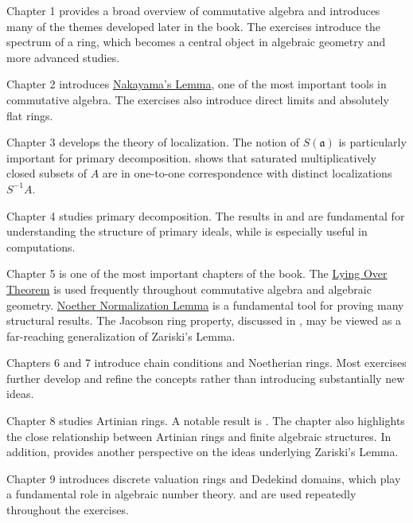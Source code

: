 Chapter 1 provides a broad overview of commutative algebra and introduces many of the themes developed later in the book. The exercises introduce the spectrum of a ring, which becomes a central object in algebraic geometry and more advanced studies.
\vspace{10pt}

Chapter 2 introduces \hyperref[2.6]{Nakayama's Lemma}, one of the most important tools in commutative algebra. The exercises also introduce direct limits and absolutely flat rings.
\vspace{10pt}

Chapter 3 develops the theory of localization. The notion of $S(\mathfrak{a})$ is particularly important for primary decomposition.  shows that saturated multiplicatively closed subsets of $A$ are in one-to-one correspondence with distinct localizations $S^{-1}A$.
\vspace{10pt}

Chapter 4 studies primary decomposition. The results in  and  are fundamental for understanding the structure of primary ideals, while  is especially useful in computations.
\vspace{10pt}

Chapter 5 is one of the most important chapters of the book. The \hyperref[5.10]{Lying Over Theorem} is used frequently throughout commutative algebra and algebraic geometry. \hyperref[noethernormalization]{Noether Normalization Lemma} is a fundamental tool for proving many structural results. The Jacobson ring property, discussed in , may be viewed as a far-reaching generalization of Zariski's Lemma.
\vspace{10pt}

Chapters 6 and 7 introduce chain conditions and Noetherian rings. Most exercises further develop and refine the concepts rather than introducing substantially new ideas.
\vspace{10pt}

Chapter 8 studies Artinian rings. A notable result is . The chapter also highlights the close relationship between Artinian rings and finite algebraic structures. In addition,  provides another perspective on the ideas underlying Zariski's Lemma.
\vspace{10pt}

Chapter 9 introduces discrete valuation rings and Dedekind domains, which play a fundamental role in algebraic number theory.  and  are used repeatedly throughout the exercises.
\vspace{10pt}

